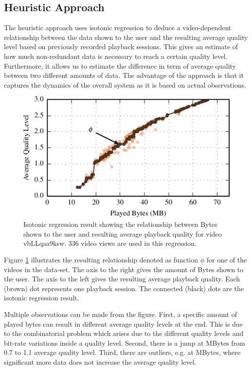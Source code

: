 
\subsection{Heuristic Approach}

The heuristic approach uses isotonic regression \cite{barlow1972statistical} to deduce a video-dependent relationship between the data shown to the user and the resulting average quality level based on previously recorded playback sessions.
This gives an estimate of how much non-redundant data is necessary to reach a certain quality level.
Furthermore, it allows us to estimate the difference in term of average quality between two different amounts of data.
The advantage of the approach is that it captures the dynamics of the overall system as it is based on actual observations.

\begin{figure}[t]
\centering
\includegraphics[width=0.9\linewidth]{figs/32_vbLLqaa9ksw.pdf}%
\caption{Isotonic regression result showing the relationship between Bytes shown to the user and resulting average playback quality for video vbLLqaa9ksw. 336 video views are used in this regression.}
\label{fig:heuristic}%
\end{figure}

Figure \ref{fig:heuristic} illustrates the resulting relationship denoted as function $\phi$ for one of the videos in the data-set.
The axis to the right gives the amount of Bytes shown to the user.
The axis to the left gives the resulting average playback quality.
Each (brown) dot represents one playback session.
The connected (black) dots are the isotonic regression result.

Multiple observations can be made from the figure. 
First, a specific amount of played bytes can result in different average quality levels at the end. 
This is due to the combinatorial problem which arises due to the different quality levels and bit-rate variations inside a quality level.
Second, there is a jump at \unit[20]{MBytes} from 0.7 to 1.1 average quality level.
Third, there are outliers, e.g. at \unit[27]{MBytes}, where significant more data does not increase the average quality level.


